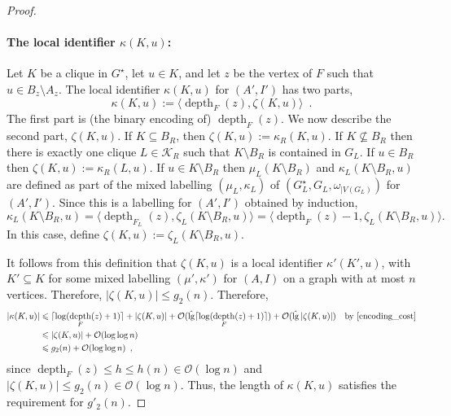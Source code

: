 \documentclass{patmorin}
\let\eqref\cref
\renewcommand{\le}{\leqslant}
\renewcommand{\leq}{\leqslant}
\DeclareMathOperator{\depth}{depth}
\DeclareMathOperator{\lgg}{\hat{lg}}
\newcommand{\Oh}{\mathcal{O}}
\DeclarePairedDelimiter{\ceil}{\lceil}{\rceil}
\begin{document}
\begin{proof}
    \paragraph{\boldmath The local identifier $\kappa(K,u)$:}
    Let $K$ be a clique in $G^\star$, let $u\in K$, and let $z$ be the vertex of $F$ such that $u\in B_z\setminus A_z$.   The local identifier $\kappa(K,u)$ for $(A',I')$ has two parts,
    \[
        \kappa(K,u) := \langle\depth_F(z),\zeta(K,u)\rangle \enspace .
    \]
    The first part is (the binary encoding of) $\depth_F(z)$. We now describe the second part, $\zeta(K,u)$.  If $K\subseteq B_R$, then $\zeta(K,u):=\kappa_R(K,u)$.
    If $K\not\subseteq B_R$ then there is exactly one clique $L\in\mathcal{K}_R$ such that $K\setminus B_R$ is contained in $G_L$.  If $u\in B_R$ then $\zeta(K,u):=\kappa_R(L,u)$.  If $u\in K\setminus B_R$ then $\mu_L(K\setminus B_R)$ and  $\kappa_L(K\setminus B_R, u)$ are defined as part of the mixed labelling $(\mu_L,\kappa_L)$ of $(G^\star_L,G_L,\omega_{|V(G_L)})$ for $(A',I')$.
    Since this is a labelling for $(A',I')$ obtained by induction, 
    \begin{equation}
      \kappa_L(K\setminus B_R,u)=\langle\depth_{F_L}(z),\zeta_{L}(K\setminus B_R,u)\rangle=\langle\depth_F(z)-1,\zeta_L(K\setminus B_R,u)\rangle.
    \label{off_by_one}
    \end{equation}
    In this case, define $\zeta(K,u):=\zeta_L(K\setminus B_R,u)$.

    It follows from this definition that $\zeta(K,u)$ is a local identifier $\kappa'(K',u)$, with $K'\subseteq K$ for some mixed labelling $(\mu',\kappa')$ for $(A,I)$ on a graph with at most $n$ vertices.  Therefore, $|\zeta(K,u)|\le g_2(n)$.  Therefore,
    \begin{align*}
      |\kappa(K,u)|
      & \le \ceil{\log(\depth_F(z)+1)} + |\zeta(K,u)|
      + \Oh(\lgg\ceil{\log(\depth_F(z)+1)}) + \Oh(\lgg|\zeta(K,u)|)
        & \text{by \eqref{encoding_cost}} \\
        &\leq |\zeta(K,u)| + \Oh(\log\log n)\\
        &\leq g_2(n) +  \Oh(\log\log n)\enspace,
    \end{align*}
    since $\depth_F(z)\le h\le h(n)\in \Oh(\log n)$ and $|\zeta(K,u)|\le g_2(n)\in\Oh(\log n)$.  Thus, the length of $\kappa(K,u)$ satisfies the requirement for $g'_2(n)$.


\end{proof}
\end{document}
